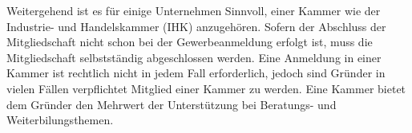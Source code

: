 
Weitergehend ist es für einige Unternehmen Sinnvoll, einer Kammer wie der Industrie- und Handelskammer (IHK) anzugehören.
Sofern der Abschluss der Mitgliedschaft nicht schon bei der Gewerbeanmeldung erfolgt ist, muss die Mitgliedschaft selbstständig
abgeschlossen werden. Eine Anmeldung in einer Kammer ist rechtlich nicht in jedem Fall erforderlich, jedoch sind Gründer in vielen 
Fällen verpflichtet Mitglied einer Kammer zu werden. Eine Kammer bietet dem Gründer den Mehrwert der Unterstützung bei Beratungs- und Weiterbilungsthemen.